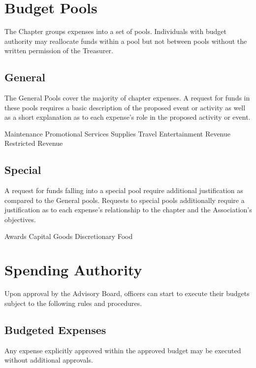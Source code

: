 \documentclass[bylaws,final,10pt,withoutoptional,withoutpreface,officerdoc]{../bylaws}
\begin{document}
\chapter{Budget Pools}\label{sec:pools}
The Chapter groups expenses into a set of pools. Individuals with budget authority may reallocate funds within a pool but not between pools without the written permission of the Treasurer.
\section{General} The General Pools cover the majority of chapter expenses. A request for funds in these pools requires a basic description of the proposed event or activity as well as a short explanation as to each expense's role in the proposed activity or event.
\begin{enumsubsection}
\itemnotoc Maintenance 
\itemnotoc Promotional
\itemnotoc Services
\itemnotoc Supplies
\itemnotoc Travel
\itemnotoc Entertainment
\itemnotoc Revenue
\itemnotoc Restricted Revenue
\end{enumsubsection}

\section{Special} A request for funds falling into a special pool require additional justification as compared to the General pools. Requests to special pools additionally require a justification as to each expense's relationship to the chapter and the Association's objectives.
\begin{enumsubsection}
\itemnotoc Awards
\itemnotoc Capital Goods
\itemnotoc Discretionary
\itemnotoc Food 
\end{enumsubsection}


\chapter{Spending Authority}\label{sec:authority}
Upon approval by the Advisory Board, officers can start to execute their budgets subject to the following rules and procedures.
\section{Budgeted Expenses} Any expense explicitly approved within the approved budget may be executed without additional approvals.
\end{document}
